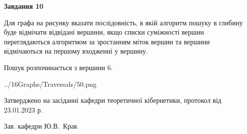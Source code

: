 \documentclass[12pt, ukrainian]{article}
\begin{document}
{\begin {large}
{\begin {center}\textbf{Завдання 10}\end {center}}\par
Для графа на рисунку вказати послідовність, в якій алгоритм пошуку в глибину буде відмічати відвідані вершини, якщо списки суміжності вершин переглядаються алгоритмом за зростанням міток вершин та вершини відмічаються на першому вход\-женні у вершину.\par
Пошук розпочинається з вершини 6.\par

\begin{center}
	{../16Graphs/Traversals/50.png}
\end{center}\par
\newpage


\end {large}
}
{\smallskip \begin {small} Затверджено на засіданні кафедри теоретичної кібернетики, протокол  від   23.01.2023 р.\par\smallskip\smallskip
{\parbox {6.5 cm}{Зав. кафедри \dotfill Ю.В.~Крак}} \end{small}}
\end{document}
